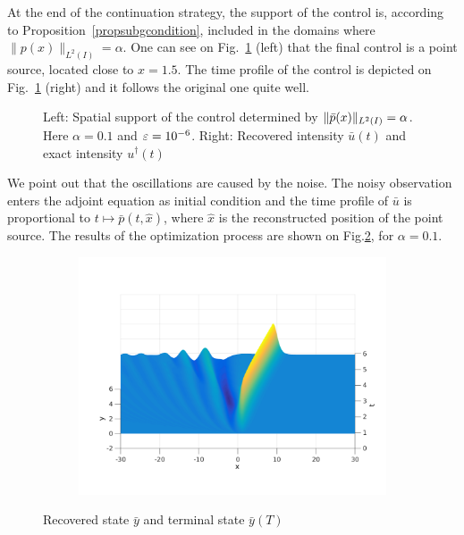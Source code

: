At the end of the continuation strategy, the support of the control is, according to Proposition~\ref{propsubgcondition}, included in the domains where $\|p(x)\|_{L^2(I)} = \alpha$. One can see on Fig.~\ref{support} (left) that the final control is a point source, located close to $x=1.5$. The time profile of the control is depicted on Fig.~\ref{support} (right) and it follows the original one quite well.
\begin{figure}[htb]
\begin{subfigure}[b]{0.5\textwidth}
\centering

\end{subfigure}\qquad
\begin{subfigure}[b]{0.5\textwidth}
\centering

\end{subfigure}
\caption{Left: Spatial support of the control determined by $\lVert\bar p(x)\rVert_{L^2(I)} = \alpha$. Here $\alpha = 0.1$ and $\varepsilon = 10^{-6}$. Right: Recovered intensity $\bar u(t)$ and exact intensity $u^\dag(t)$ }
\label{support}
\end{figure}
We point out that the oscillations are caused by the noise. The noisy observation enters the adjoint equation as initial condition and the time profile of $\bar u$ is proportional to $t\mapsto\bar p(t,\hat x)$, where $\hat x$ is the reconstructed position of the point source. The results  of the optimization process are shown on Fig.\ref{recoveredstate}, for $\alpha = 0.1$.
\begin{figure}[htb]
\begin{subfigure}[b]{0.5\textwidth}
\centering
\includegraphics[width =\textwidth]{images/ex1recoveredstate3d.pdf}
\end{subfigure}\qquad
\begin{subfigure}[b]{0.5\textwidth}
\centering

\end{subfigure}
\caption{Recovered state $\bar y$ and terminal state $\bar y(T)$}
\label{recoveredstate}
\end{figure}

